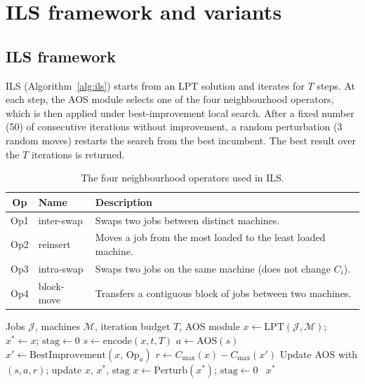 \documentclass[final,3p,times,11pt,authoryear]{elsarticle}
\begin{document}
\section{ILS framework and variants}
\label{sec:ils-framework}
\subsection{ILS framework}

ILS (Algorithm~\ref{alg:ils}) starts from an LPT solution and iterates
for $T$ steps.
At each step, the AOS module selects one of the four neighbourhood
operators, which is then applied under best-improvement local search.
After a fixed number (50) of consecutive iterations without
improvement, a random perturbation (3 random
moves) restarts the search from the best incumbent.
The best result over the $T$ iterations is returned.

\begin{table}[ht]
\centering
\caption{The four neighbourhood operators used in ILS.}
\label{tab:operators}
\begin{tabular}{@{}clp{7.5cm}@{}}
\toprule
\textbf{Op} & \textbf{Name} & \textbf{Description} \\
\midrule
Op1 & inter-swap    & Swaps two jobs between distinct machines. \\
Op2 & reinsert      & Moves a job from the most loaded to the least loaded machine. \\
Op3 & intra-swap    & Swaps two jobs on the same machine (does not change $C_i$). \\
Op4 & block-move    & Transfers a contiguous block of jobs between two machines. \\
\bottomrule
\end{tabular}
\end{table}

\begin{algorithm}[tb]
\caption{ILS with AOS for PMSP}
\label{alg:ils}
\begin{algorithmic}[1]
\REQUIRE Jobs $\mathcal{J}$, machines $\mathcal{M}$, iteration budget $T$, AOS module
\STATE $x \leftarrow \mathrm{LPT}(\mathcal{J},\mathcal{M})$; $x^{*} \leftarrow x$; $\mathrm{stag} \leftarrow 0$
\STATE $s \leftarrow \mathrm{encode}(x, t, T)$
\STATE $a \leftarrow \mathrm{AOS}(s)$
\STATE $x' \leftarrow \mathrm{BestImprovement}(x,\, \mathrm{Op}_a)$
\STATE $r \leftarrow C_{\max}(x) - C_{\max}(x')$
\STATE Update AOS with $(s, a, r)$; update $x$, $x^{*}$, $\mathrm{stag}$
\STATE $x \leftarrow \mathrm{Perturb}(x^{*})$; $\mathrm{stag} \leftarrow 0$
\ENDIF
\ENDFOR
\RETURN~$x^{*}$
\end{algorithmic}
\end{algorithm}
\end{document}
